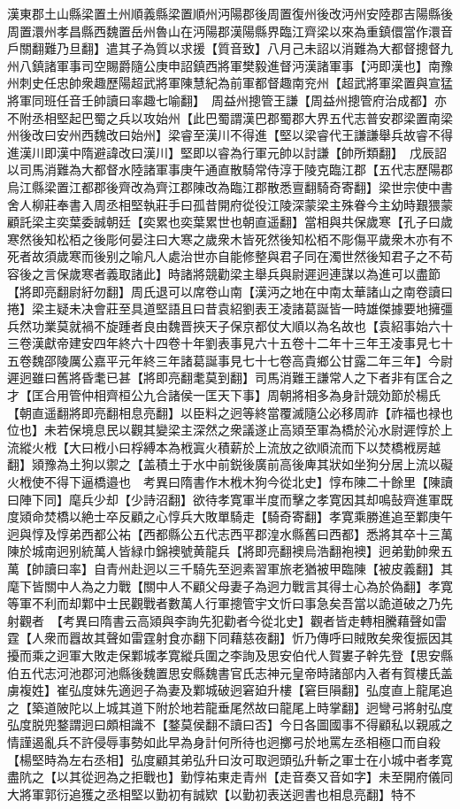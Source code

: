 漢東郡土山縣梁置土州順義縣梁置順州沔陽郡後周置復州後改沔州安陸郡吉陽縣後周置澴州孝昌縣西魏置岳州魯山在沔陽郡漢陽縣界臨江齊梁以來為重鎮儇當作澴音戶關翻難乃旦翻】遣其子為質以求援【質音致】八月己未詔以消難為大都督摠督九州八鎮諸軍事司空賜爵隨公庚申詔鎮西將軍樊毅進督沔漢諸軍事【沔即漢也】南豫州刺史任忠帥衆趣歷陽超武將軍陳慧紀為前軍都督趣南兖州【超武將軍梁置與宣猛將軍同班任音壬帥讀曰率趣七喻翻】　周益州摠管王謙【周益州摠管府治成都】亦不附丞相堅起巴蜀之兵以攻始州【此巴蜀謂漢巴郡蜀郡大界五代志普安郡梁置南梁州後改曰安州西魏改曰始州】梁睿至漢川不得進【堅以梁睿代王謙謙舉兵故睿不得進漢川即漢中隋避諱改曰漢川】堅即以睿為行軍元帥以討謙【帥所類翻】　戊辰詔以司馬消難為大都督水陸諸軍事庚午通直散騎常侍淳于陵克臨江郡【五代志歷陽郡烏江縣梁置江都郡後齊改為齊江郡陳改為臨江郡散悉亶翻騎奇寄翻】梁世宗使中書舍人柳莊奉書入周丞相堅執莊手曰孤昔開府從役江陵深蒙梁主殊眷今主幼時艱猥蒙顧託梁主奕葉委誠朝廷【奕累也奕葉累世也朝直遥翻】當相與共保歲寒【孔子曰歲寒然後知松栢之後彫何晏注曰大寒之歲衆木皆死然後知松栢不彫傷平歲衆木亦有不死者故須歲寒而後别之喻凡人處治世亦自能修整與君子同在濁世然後知君子之不苟容後之言保歲寒者義取諸此】時諸將競勸梁主舉兵與尉遲迥連謀以為進可以盡節【將即亮翻尉紆勿翻】周氏退可以席卷山南【漢沔之地在中南太華諸山之南卷讀曰捲】梁主疑未决會莊至具道堅語且曰昔袁紹劉表王凌諸葛誕皆一時雄傑據要地擁彊兵然功業莫就禍不旋踵者良由魏晋挾天子保京都仗大順以為名故也【袁紹事始六十三卷漢獻帝建安四年終六十四卷十年劉表事見六十五卷十二年十三年王凌事見七十五卷魏邵陵厲公嘉平元年終三年諸葛誕事見七十七卷高貴鄉公甘露二年三年】今尉遲迥雖曰舊將昏耄已甚【將即亮翻耄莫到翻】司馬消難王謙常人之下者非有匡合之才【匡合用管仲相齊桓公九合諸侯一匡天下事】周朝將相多為身計競効節於楊氏【朝直遥翻將即亮翻相息亮翻】以臣料之迥等終當覆滅隨公必移周祚【祚福也禄也位也】未若保境息民以觀其變梁主深然之衆議遂止高熲至軍為橋於沁水尉遲惇於上流縱火栰【大曰栰小曰桴縛本為栰寘火積薪於上流放之欲順流而下以焚橋栰房越翻】熲豫為土狗以禦之【盖積土于水中前鋭後廣前高後庳其狀如坐狗分居上流以礙火栰使不得下逼橋邉也　考異曰隋書作木栰木狗今從北史】惇布陳二十餘里【陳讀曰陣下同】麾兵少却【少詩沼翻】欲待孝寛軍半度而擊之孝寛因其却鳴鼔齊進軍既度熲命焚橋以絶士卒反顧之心惇兵大敗單騎走【騎奇寄翻】孝寛乘勝進追至鄴庚午迥與惇及惇弟西都公祐【西都縣公五代志西平郡湟水縣舊曰西都】悉將其卒十三萬陳於城南迥别統萬人皆緑巾錦襖號黄龍兵【將即亮翻襖烏浩翻袍襖】迥弟勤帥衆五萬【帥讀曰率】自青州赴迥以三千騎先至迥素習軍旅老猶被甲臨陳【被皮義翻】其麾下皆關中人為之力戰【關中人不顧父母妻子為迥力戰言其得士心為於偽翻】孝寛等軍不利而却鄴中士民觀戰者數萬人行軍摠管宇文忻曰事急矣吾當以詭道破之乃先射觀者　【考異曰隋書云高熲與李詢先犯勸者今從北史】觀者皆走轉相騰藉聲如雷霆【人衆而囂故其聲如雷霆射食亦翻下同藉慈夜翻】忻乃傳呼曰賊敗矣衆復振因其擾而乘之迥軍大敗走保鄴城孝寛縱兵圍之李詢及思安伯代人賀婁子幹先登【思安縣伯五代志河池郡河池縣後魏置思安縣魏書官氏志神元皇帝時諸部内入者有賀樓氏盖虜複姓】崔弘度妹先適迥子為妻及鄴城破迥窘廹升樓【窘巨隕翻】弘度直上龍尾追之【築道陂陀以上城其道下附於地若龍垂尾然故曰龍尾上時掌翻】迥彎弓將射弘度弘度脱兜鍪謂迥曰頗相識不【鍪莫侯翻不讀曰否】今日各圖國事不得顧私以親戚之情謹遏亂兵不許侵辱事勢如此早為身計何所待也迥擲弓於地罵左丞相極口而自殺【楊堅時為左右丞相】弘度顧其弟弘升曰汝可取迥頭弘升斬之軍士在小城中者孝寛盡阬之【以其從迥為之拒戰也】勤惇祐東走青州【走音奏又音如字】未至開府儀同大將軍郭衍追獲之丞相堅以勤初有誠欵【以勤初表送迥書也相息亮翻】特不
